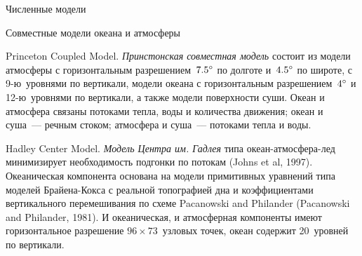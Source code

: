\begin{chapter}{Численные модели}
\begin{section}{Совместные модели океана и атмосферы}
\begin{paragraph}{Princeton Coupled Model.}%
\emph{Принстонская совместная модель} состоит из модели атмосферы 
с горизонтальным разрешением~${7.5}^\circ$ по долготе и~${4.5}^\circ$ 
по широте, с 9-ю~уровнями по вертикали, модели океана
с горизонтальным разрешением~${4}^\circ$ и 12-ю~уровнями по вертикали, 
а также модели поверхности суши. Океан и атмосфера связаны потоками
тепла, воды и количества движения; океан и суша~--- речным стоком;
атмосфера и суша~--- потоками тепла и воды.
%
\end{paragraph}

\begin{paragraph}{Hadley Center Model.}%
\emph{Модель Центра им. Гадлея} типа океан-атмосфера-лед минимизирует 
необходимость подгонки по 
потокам 
(Johns et al, 1997). Океаническая компонента основана на модели примитивных
уравнений типа моделей Брайена-Кокса с реальной топографией
дна и коэффициентами вертикального перемешивания%
по схеме Pacanowski and Philander (Pacanowski and Philander, 1981). 
И океаническая, и атмосферная компоненты имеют горизонтальное 
разрешение $96\times 73$~узловых точек, океан содержит
20~уровней по вертикали.
%


\end{paragraph}
\end{section}
\end{chapter}
